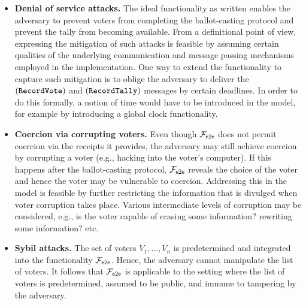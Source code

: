 \begin{itemize}
\item \textbf{Denial of service attacks.} The ideal functionality as
  written enables the adversary to prevent voters from completing the
  ballot-casting protocol and prevent the tally from becoming
  available. From a definitional point of view, expressing the
  mitigation of such attacks is feasible by assuming certain qualities
  of the underlying communication and message passing mechanisms
  employed in the implementation. One way to extend the functionality
  to capture such mitigation is to oblige the adversary to deliver the
  $(\mathtt{RecordVote})$ and $(\mathtt{RecordTally})$ messages by certain
  deadlines. In order to do this formally, a notion of time would have
  to be introduced in the model, for example by introducing a global
  clock functionality.

\item \textbf{Coercion via corrupting voters.} Even though $\mathcal{F}_{\mathsf{e2e}}$
  does not permit coercion via the receipts it provides, the adversary
  may still achieve coercion by corrupting a voter (e.g., hacking into
  the voter's computer). If this happens after the ballot-casting
  protocol, $\mathcal{F}_{\mathsf{e2e}}$ reveals the choice of the voter and hence the
  voter may be vulnerable to coercion.  Addressing this in the model
  is feasible by further restricting the information that is divulged
  when voter corruption takes place. Various intermediate levels of
  corruption may be considered, e.g., is the voter capable of erasing
  some information? rewriting some information? etc.

\item \textbf{Sybil attacks.} The set of voters $V_1,\ldots,V_n$ is
  predetermined and integrated into the functionality $\mathcal{F}_{\mathsf{e2e}}$. Hence,
  the adversary cannot manipulate the list of voters.  It follows that
  $\mathcal{F}_{\mathsf{e2e}}$ is applicable to the setting where the list of voters is
  predetermined, assumed to be public, and immune to tampering by the
  adversary. 
\end{itemize}

